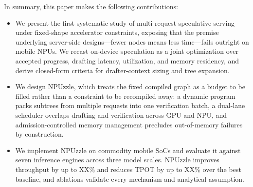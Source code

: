 \documentclass[sigconf,nonacm,10pt]{acmart}
\newcommand{\name}{NPUzzle\xspace}
\begin{document}
In summary, this paper makes the following contributions:
\begin{itemize}[leftmargin=*]
\item We present the first systematic study of multi-request speculative serving under fixed-shape accelerator constraints, exposing that the premise underlying server-side designs---fewer nodes means less time---fails outright on mobile NPUs. We recast on-device speculation as a joint optimization over accepted progress, drafting latency, utilization, and memory residency, and derive closed-form criteria for drafter-context sizing and tree expansion.

\item We design \name, which treats the fixed compiled graph as a budget to be filled rather than a constraint to be recompiled away: a dynamic program packs subtrees from multiple requests into one verification batch, a dual-lane scheduler overlaps drafting and verification across GPU and NPU, and admission-controlled memory management precludes out-of-memory failures by construction.

\item We implement \name on commodity mobile SoCs and evaluate it against seven inference engines across three model scales. \name improves throughput by up to XX\% and reduces TPOT by up to XX\% over the best baseline, and ablations validate every mechanism and analytical assumption.
\end{itemize}

\end{document}
